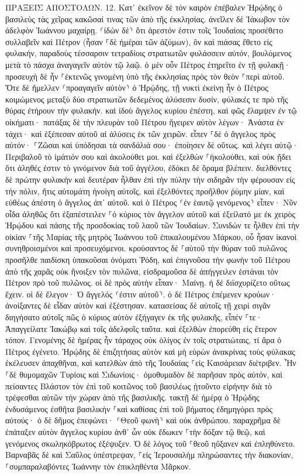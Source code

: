 \documentclass[twoside, 9pt]{extreport}
\begin{document}
ΠΡΑΞΕΙΣ ΑΠΟΣΤΟΛΩΝ.
12.
Κατ᾽ ἐκεῖνον δὲ τὸν καιρὸν ἐπέβαλεν Ἡρῴδης ὁ βασιλεὺς τὰς χεῖρας κακῶσαί τινας τῶν ἀπὸ τῆς ἐκκλησίας. 
ἀνεῖλεν δὲ Ἰάκωβον τὸν ἀδελφὸν Ἰωάννου μαχαίρῃ. 
⸂ἰδὼν δὲ⸃ ὅτι ἀρεστόν ἐστιν τοῖς Ἰουδαίοις προσέθετο συλλαβεῖν καὶ Πέτρον (ἦσαν ⸀δὲ ἡμέραι τῶν ἀζύμων), 
ὃν καὶ πιάσας ἔθετο εἰς φυλακήν, παραδοὺς τέσσαρσιν τετραδίοις στρατιωτῶν φυλάσσειν αὐτόν, βουλόμενος μετὰ τὸ πάσχα ἀναγαγεῖν αὐτὸν τῷ λαῷ. 
ὁ μὲν οὖν Πέτρος ἐτηρεῖτο ἐν τῇ φυλακῇ· προσευχὴ δὲ ἦν ⸀ἐκτενῶς γινομένη ὑπὸ τῆς ἐκκλησίας πρὸς τὸν θεὸν ⸀περὶ αὐτοῦ. 
Ὅτε δὲ ἤμελλεν ⸂προαγαγεῖν αὐτὸν⸃ ὁ Ἡρῴδης, τῇ νυκτὶ ἐκείνῃ ἦν ὁ Πέτρος κοιμώμενος μεταξὺ δύο στρατιωτῶν δεδεμένος ἁλύσεσιν δυσίν, φύλακές τε πρὸ τῆς θύρας ἐτήρουν τὴν φυλακήν. 
καὶ ἰδοὺ ἄγγελος κυρίου ἐπέστη, καὶ φῶς ἔλαμψεν ἐν τῷ οἰκήματι· πατάξας δὲ τὴν πλευρὰν τοῦ Πέτρου ἤγειρεν αὐτὸν λέγων· Ἀνάστα ἐν τάχει· καὶ ἐξέπεσαν αὐτοῦ αἱ ἁλύσεις ἐκ τῶν χειρῶν. 
εἶπεν ⸀δὲ ὁ ἄγγελος πρὸς αὐτόν· ⸀Ζῶσαι καὶ ὑπόδησαι τὰ σανδάλιά σου· ἐποίησεν δὲ οὕτως. καὶ λέγει αὐτῷ· Περιβαλοῦ τὸ ἱμάτιόν σου καὶ ἀκολούθει μοι. 
καὶ ἐξελθὼν ⸀ἠκολούθει, καὶ οὐκ ᾔδει ὅτι ἀληθές ἐστιν τὸ γινόμενον διὰ τοῦ ἀγγέλου, ἐδόκει δὲ ὅραμα βλέπειν. 
διελθόντες δὲ πρώτην φυλακὴν καὶ δευτέραν ἦλθαν ἐπὶ τὴν πύλην τὴν σιδηρᾶν τὴν φέρουσαν εἰς τὴν πόλιν, ἥτις αὐτομάτη ἠνοίγη αὐτοῖς, καὶ ἐξελθόντες προῆλθον ῥύμην μίαν, καὶ εὐθέως ἀπέστη ὁ ἄγγελος ἀπ᾽ αὐτοῦ. 
καὶ ὁ Πέτρος ⸂ἐν ἑαυτῷ γενόμενος⸃ εἶπεν· Νῦν οἶδα ἀληθῶς ὅτι ἐξαπέστειλεν ⸀ὁ κύριος τὸν ἄγγελον αὐτοῦ καὶ ἐξείλατό με ἐκ χειρὸς Ἡρῴδου καὶ πάσης τῆς προσδοκίας τοῦ λαοῦ τῶν Ἰουδαίων. 
Συνιδών τε ἦλθεν ἐπὶ τὴν οἰκίαν ⸀τῆς Μαρίας τῆς μητρὸς Ἰωάννου τοῦ ἐπικαλουμένου Μάρκου, οὗ ἦσαν ἱκανοὶ συνηθροισμένοι καὶ προσευχόμενοι. 
κρούσαντος δὲ ⸀αὐτοῦ τὴν θύραν τοῦ πυλῶνος προσῆλθε παιδίσκη ὑπακοῦσαι ὀνόματι Ῥόδη, 
καὶ ἐπιγνοῦσα τὴν φωνὴν τοῦ Πέτρου ἀπὸ τῆς χαρᾶς οὐκ ἤνοιξεν τὸν πυλῶνα, εἰσδραμοῦσα δὲ ἀπήγγειλεν ἑστάναι τὸν Πέτρον πρὸ τοῦ πυλῶνος. 
οἱ δὲ πρὸς αὐτὴν εἶπαν· Μαίνῃ. ἡ δὲ διϊσχυρίζετο οὕτως ἔχειν. οἱ δὲ ἔλεγον· Ὁ ἄγγελός ⸂ἐστιν αὐτοῦ⸃. 
ὁ δὲ Πέτρος ἐπέμενεν κρούων· ἀνοίξαντες δὲ εἶδαν αὐτὸν καὶ ἐξέστησαν. 
κατασείσας δὲ αὐτοῖς τῇ χειρὶ σιγᾶν διηγήσατο αὐτοῖς πῶς ὁ κύριος αὐτὸν ἐξήγαγεν ἐκ τῆς φυλακῆς, εἶπέν ⸀τε· Ἀπαγγείλατε Ἰακώβῳ καὶ τοῖς ἀδελφοῖς ταῦτα. καὶ ἐξελθὼν ἐπορεύθη εἰς ἕτερον τόπον. 
Γενομένης δὲ ἡμέρας ἦν τάραχος οὐκ ὀλίγος ἐν τοῖς στρατιώταις, τί ἄρα ὁ Πέτρος ἐγένετο. 
Ἡρῴδης δὲ ἐπιζητήσας αὐτὸν καὶ μὴ εὑρὼν ἀνακρίνας τοὺς φύλακας ἐκέλευσεν ἀπαχθῆναι, καὶ κατελθὼν ἀπὸ τῆς Ἰουδαίας ⸀εἰς Καισάρειαν διέτριβεν. 
Ἦν ⸀δὲ θυμομαχῶν Τυρίοις καὶ Σιδωνίοις· ὁμοθυμαδὸν δὲ παρῆσαν πρὸς αὐτόν, καὶ πείσαντες Βλάστον τὸν ἐπὶ τοῦ κοιτῶνος τοῦ βασιλέως ᾐτοῦντο εἰρήνην διὰ τὸ τρέφεσθαι αὐτῶν τὴν χώραν ἀπὸ τῆς βασιλικῆς. 
τακτῇ δὲ ἡμέρᾳ ὁ Ἡρῴδης ἐνδυσάμενος ἐσθῆτα βασιλικὴν ⸀καὶ καθίσας ἐπὶ τοῦ βήματος ἐδημηγόρει πρὸς αὐτούς· 
ὁ δὲ δῆμος ἐπεφώνει· ⸂Θεοῦ φωνὴ⸃ καὶ οὐκ ἀνθρώπου. 
παραχρῆμα δὲ ἐπάταξεν αὐτὸν ἄγγελος κυρίου ἀνθ᾽ ὧν οὐκ ἔδωκεν ⸀τὴν δόξαν τῷ θεῷ, καὶ γενόμενος σκωληκόβρωτος ἐξέψυξεν. 
Ὁ δὲ λόγος τοῦ ⸀θεοῦ ηὔξανεν καὶ ἐπληθύνετο. 
Βαρναβᾶς δὲ καὶ Σαῦλος ὑπέστρεψαν, ⸀εἰς Ἰερουσαλὴμ πληρώσαντες τὴν διακονίαν, ⸀συμπαραλαβόντες Ἰωάννην τὸν ἐπικληθέντα Μᾶρκον. 
\end{document}
